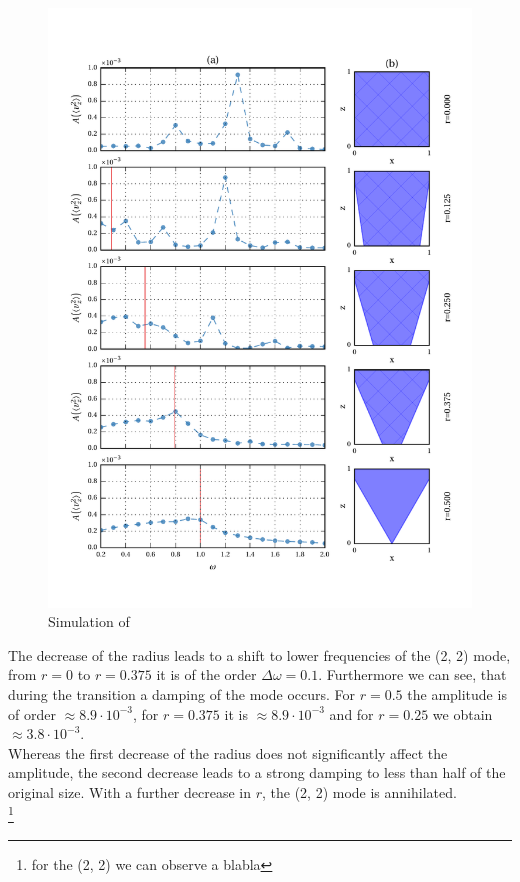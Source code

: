 \begin{figure}[!pt]
  \centering
  \includegraphics{gfx/cone/transition/transition.pdf}
  \caption{\label{fig:cone:transition}
    Simulation of
  }
\end{figure}

The decrease of the radius leads to a shift to lower frequencies of the (2, 2) mode,
from $r=0$ to $r=0.375$ it is of the order $\Delta \omega=0.1$.
Furthermore we can see, that during the transition a damping of the mode occurs.
For $r=0.5$ the amplitude is of order $\approx8.9\cdot10^{-3}$, for $r=0.375$ it is
$\approx8.9\cdot10^{-3}$ and for $r=0.25$ we obtain $\approx3.8\cdot10^{-3}$.\\
Whereas the first decrease of the radius does not significantly affect the amplitude,
the second decrease leads to a strong damping to less than half of the original size.
With a further decrease in $r$, the (2, 2) mode is annihilated.\\
\footnote{ for the (2, 2) we can observe a blabla}

